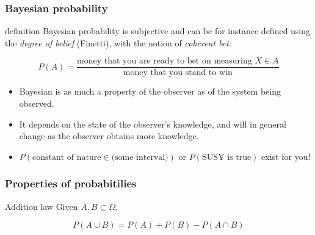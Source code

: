 \documentclass[9pt]{beamer}
\newif\ifmynote
\newcommand\mynote[1]{%
\ifmynote \textbf{#1} \else \fi
}
\begin{document}
\begin{frame}
 \frametitle{Bayesian probability}
 
 \mynote{Écrire au tableau avant}
 
 \begin{block}{definition}
  Bayesian probability is subjective and can be for instance defined using the \emph{degree of belief} (Finetti), with the notion of \emph{coherent bet}:
  
  $$P(A) = \frac{\text{money that you are ready to bet on measuring } X \in A}{\text{money that you stand to win}}$$
 \end{block}
 
 \begin{itemize}
  \item<2-> Bayesian is as much a property of the observer as of the system being observed.
  \item<3-> It depends on the state of the observer's knowledge, and will in general change as the observer obtains more knowledge.
  \item<4-> $P(\text{constant of nature} \in \text{(some interval)})$ or $P(\text{SUSY is true})$ exist for you!
 \end{itemize}


\end{frame}

\begin{frame}
 \frametitle{Properties of probabitilies}
 
 \mynote{Écrire au tableau}
 
 \begin{block}{Addition law}
  Given $A, B \subset \Omega$, 
  
  $$P(A \cup B) = P(A) + P(B) - P(A \cap B)$$
 \end{block}
 


\end{frame}
\end{document}
